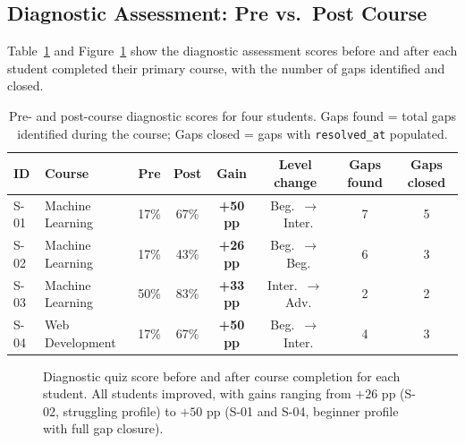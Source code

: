\documentclass[12pt,a4paper]{article}
\begin{document}
\subsection{Diagnostic Assessment: Pre vs.\ Post Course}

Table~\ref{tab:student_beforeafter} and Figure~\ref{fig:student_beforeafter}
show the diagnostic assessment scores before and after each student completed
their primary course, with the number of gaps identified and closed.

\begin{table}[H]
  \centering
  \caption{Pre- and post-course diagnostic scores for four students.
  Gaps found = total gaps identified during the course;
  Gaps closed = gaps with \texttt{resolved\_at} populated.}
  \label{tab:student_beforeafter}
  \begin{tabular}{@{}llcccccc@{}}
    \toprule
    \textbf{ID} & \textbf{Course} & \textbf{Pre} & \textbf{Post} &
    \textbf{Gain} & \textbf{Level change} & \textbf{Gaps found} & \textbf{Gaps closed} \\
    \midrule
    S-01 & Machine Learning  & 17\% & 67\% & \textbf{+50 pp} & Beg.~$\to$~Inter.  & 7  & 5 \\
    S-02 & Machine Learning  & 17\% & 43\% & \textbf{+26 pp} & Beg.~$\to$~Beg.    & 6  & 3 \\
    S-03 & Machine Learning  & 50\% & 83\% & \textbf{+33 pp} & Inter.~$\to$~Adv.  & 2  & 2 \\
    S-04 & Web Development   & 17\% & 67\% & \textbf{+50 pp} & Beg.~$\to$~Inter.  & 4  & 3 \\
    \bottomrule
  \end{tabular}
\end{table}

\begin{figure}[H]
\centering
{}
\caption{Diagnostic quiz score before and after course completion for each
student. All students improved, with gains ranging from $+26$ pp (S-02,
struggling profile) to $+50$ pp (S-01 and S-04, beginner profile with
full gap closure).}
\label{fig:student_beforeafter}
\end{figure}
\end{document}

